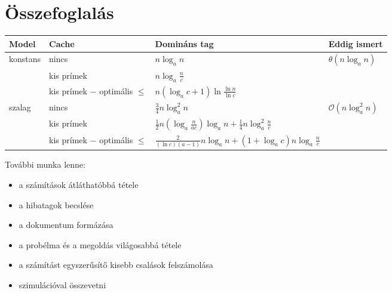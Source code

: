 \documentclass{article}
\begin{document}
\section{Összefoglalás}

\begin{tabular}{|l|l|l|l|}
\hline
Model & Cache & Domináns tag & Eddig ismert \\
\hline
\multirow{3}{*}{konstans} & nincs & $n \log_{a}{n}$ & $\theta(n \log_{a}{n})$ \\
\cline{2-4}
 & kis prímek & $n \log_{a}{\frac{n}{c}}$ & \\
\cline{2-4}
 & kis prímek $-$ optimális $\le$ & $n \left( \log_{a}{c} + 1 \right) \ln{\frac{\ln{n}}{\ln{c}}}$ & \\
\hline
\multirow{3}{*}{szalag}  & nincs & $\frac{3}{4} n \log_{a}^2{n}$ & $\mathcal{O}(n \log^2_{a}{n})$ \\
\cline{2-4}
 & kis prímek & $\frac{1}{2} n \left( \log_{a}{\frac{n}{a c}} \right) \log_{a}{n} + \frac{1}{4} n \log_{a}^2{\frac{n}{c}}$ & \\
\cline{2-4}
 & kis prímek $-$ optimális $\le$ & $\frac{2 }{(\ln{c}) (a-1)} n \log_{a}{n} + \left( 1 + \log_{a}{c} \right) n \log_{a}{\frac{n}{c}}$ & \\
\hline
\end{tabular}

További munka lenne:
\begin{itemize}
\item a számítások átláthatóbbá tétele
\item a hibatagok becslése
\item a dokumentum formázása
\item a probélma és a megoldás világosabbá tétele
\item a számítást egyszerűsítő kisebb csalások felszámolása
\item szimulációval összevetni
\end{itemize}
\end{document}
